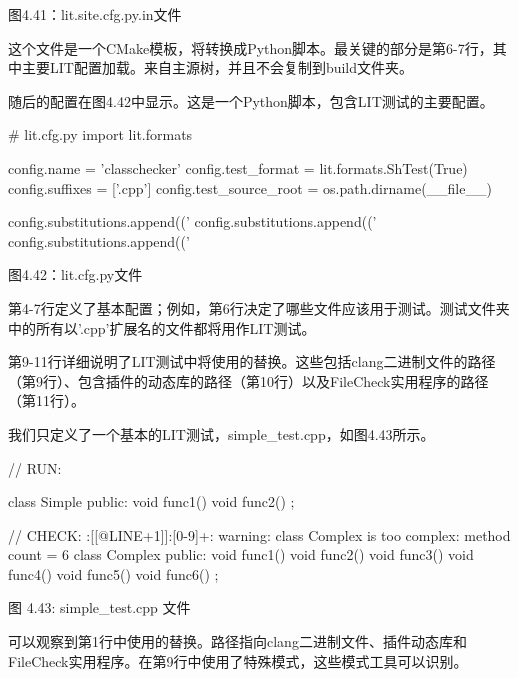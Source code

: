 \begin{center}
图4.41：lit.site.cfg.py.in文件
\end{center}

这个文件是一个CMake模板，将转换成Python脚本。最关键的部分是第6-7行，其中主要LIT配置加载。来自主源树，并且不会复制到build文件夹。

随后的配置在图4.42中显示。这是一个Python脚本，包含LIT测试的主要配置。

\begin{python}
# lit.cfg.py
import lit.formats

config.name = 'classchecker'
config.test_format = lit.formats.ShTest(True)
config.suffixes = ['.cpp']
config.test_source_root = os.path.dirname(__file__)

config.substitutions.append(('%
config.substitutions.append(('%
config.substitutions.append(('%
\end{python}

\begin{center}
图4.42：lit.cfg.py文件
\end{center}

第4-7行定义了基本配置；例如，第6行决定了哪些文件应该用于测试。测试文件夹中的所有以'.cpp'扩展名的文件都将用作LIT测试。

第9-11行详细说明了LIT测试中将使用的替换。这些包括clang二进制文件的路径（第9行）、包含插件的动态库的路径（第10行）以及FileCheck实用程序的路径（第11行）。

我们只定义了一个基本的LIT测试，simple\_test.cpp，如图4.43所示。

\begin{cpp}
// RUN: %

class Simple {
public:
  void func1() {}
  void func2() {}
};

// CHECK: :[[@LINE+1]]:{{[0-9]+}}: warning: class Complex is too complex: method count = 6
class Complex {
public:
  void func1() {}
  void func2() {}
  void func3() {}
  void func4() {}
  void func5() {}
  void func6() {}
};
\end{cpp}

\begin{center}
图 4.43: simple\_test.cpp 文件
\end{center}

可以观察到第1行中使用的替换。路径指向clang二进制文件、插件动态库和FileCheck实用程序。在第9行中使用了特殊模式，这些模式工具可以识别。

